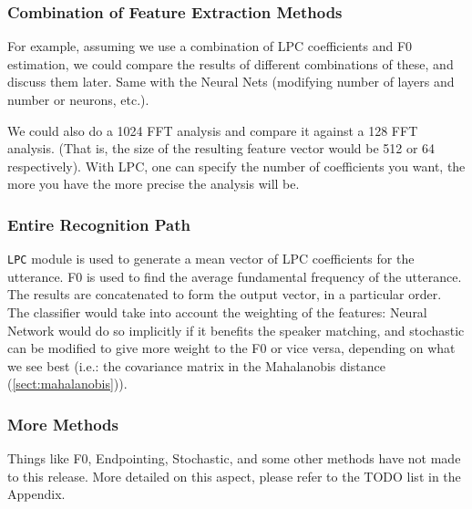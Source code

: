 \subsubsection{Combination of Feature Extraction Methods}

For example, assuming we use a combination of LPC coefficients and F0
estimation, we could compare the results of different combinations of
these, and discuss them later. Same with the
Neural Nets (modifying number of layers and number or neurons, etc.).

We could also do a 1024 FFT analysis and compare it against a 128 FFT
analysis.  (That is, the size of the resulting feature vector would be 512 or 64 respectively).
With LPC, one can specify the number of coefficients you want, the more you
have the more precise the analysis will be.

\subsubsection{Entire Recognition Path}

\verb+LPC+ module is used to generate a mean vector of LPC coefficients for
the utterance. F0 is used to find the average fundamental frequency of the
utterance. The results are concatenated to form the output vector, in a
particular order. The classifier would take into account the weighting of
the features: Neural Network would do so implicitly if it benefits the speaker
matching, and stochastic can be modified to give more weight to the F0 or
vice versa, depending on what we see best (i.e.: the covariance matrix in the
Mahalanobis distance (\ref{sect:mahalanobis})).

\subsubsection{More Methods}

Things like F0, Endpointing, Stochastic, and some other methods have not made to this release.
More detailed on this aspect, please refer to the TODO list in the Appendix.

